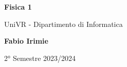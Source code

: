 \begin{titlepage}
	\begin{center}
		\vspace*{1cm}

		\Huge
		\textbf{Fisica 1}

		\vspace{0.5cm}
		\LARGE
		UniVR - Dipartimento di Informatica

		\vspace{1.5cm}

		\textbf{Fabio Irimie}

		\vfill


		\vspace{0.8cm}


		2° Semestre 2023/2024

	\end{center}
\end{titlepage}
